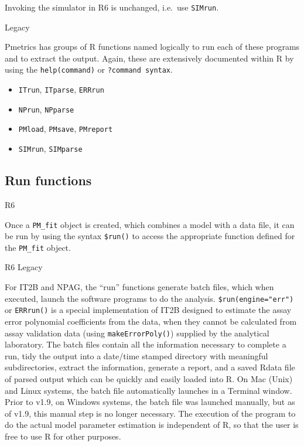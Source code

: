 \documentclass[
]{book}
\newenvironment{Shaded}{\begin{snugshade}}{\end{snugshade}}
\newcommand{\FunctionTok}[1]{\textcolor[rgb]{0.00,0.00,0.00}{#1}}
\newcommand{\NormalTok}[1]{#1}
\newcommand{\OtherTok}[1]{\textcolor[rgb]{0.56,0.35,0.01}{#1}}
\newcommand{\SpecialCharTok}[1]{\textcolor[rgb]{0.00,0.00,0.00}{#1}}
\begin{document}
Invoking the simulator in R6 is unchanged, i.e.~use \texttt{SIMrun}.

{Legacy}

Pmetrics has groups of R functions named logically to run each of these
programs and to extract the output. Again, these are extensively
documented within R by using the \texttt{help(command)} or \texttt{?command\ syntax}.

\begin{itemize}
\item
  \texttt{ITrun}, \texttt{ITparse}, \texttt{ERRrun}
\item
  \texttt{NPrun}, \texttt{NPparse}
\item
  \texttt{PMload}, \texttt{PMsave}, \texttt{PMreport}
\item
  \texttt{SIMrun}, \texttt{SIMparse}
\end{itemize}

\hypertarget{run-functions}{%
\subsection{Run functions}\label{run-functions}}

{R6}

Once a \texttt{PM\_fit} object is created, which combines a model with a data file,
it can be run by using the syntax \texttt{\$run()} to access the appropriate function
defined for the \texttt{PM\_fit} object.

\begin{Shaded}
\end{Shaded}

{R6} {Legacy}

For IT2B and NPAG, the ``run'' functions generate batch files, which when
executed, launch the software programs to do the analysis. \texttt{\$run(engine="err")}
or \texttt{ERRrun()} is a special implementation of IT2B designed to estimate
the assay error polynomial coefficients from the data, when they cannot be calculated from assay validation data (using \texttt{makeErrorPoly()}) supplied by the
analytical laboratory. The batch files contain all the information
necessary to complete a run, tidy the output into a date/time stamped
directory with meaningful subdirectories, extract the information,
generate a report, and a saved Rdata file of parsed output which can be
quickly and easily loaded into R. On Mac (Unix) and Linux systems,
the batch file automatically launches in a Terminal window.
Prior to v1.9, on Windows systems, the batch file was launched manually,
but as of v1.9, this manual step is no longer necessary. The execution of
the program to do the actual model parameter estimation is independent
of R, so that the user is free to use R for other purposes.
\end{document}
